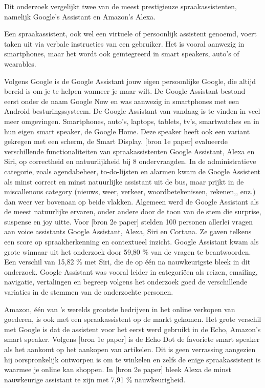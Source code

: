 Dit onderzoek vergelijkt twee van de meest prestigieuze spraakassistenten, namelijk Google’s Assistant en Amazon’s Alexa.

Een spraakassistent, ook wel een virtuele of persoonlijk assistent genoemd, voert taken uit via verbale instructies van een gebruiker. Het is vooral aanwezig in smartphones, maar het wordt ook geïntegreerd in smart speakers, auto's of wearables.

Volgens Google is de Google Assistant jouw eigen persoonlijke Google, die altijd bereid is om je te helpen wanneer je maar wilt. De Google Assistant bestond eerst onder de naam Google Now en was aanwezig in smartphones met een Android besturingssysteem. De Google Assistant van vandaag is te vinden in veel meer omgevingen. Smartphones, auto's, laptops, tablets, tv's, smartwatches en in hun eigen smart speaker, de Google Home. Deze speaker heeft ook een variant gekregen met een scherm, de Smart Display.
[bron 1e paper] evalueerde verschillende functionaliteiten van spraakassistenten Google Assistant, Alexa en Siri, op correctheid en natuurlijkheid bij 8 ondervraagden. In de administratieve categorie, zoals agendabeheer, to-do-lijsten en alarmen kwam de Google Assistent als minst correct en minst natuurlijke assistant uit de bus, maar prijkt in de miscallenous category (nieuws, weer, verkeer, woordbetekenissen, rekenen,, enz.) dan weer ver bovenaan op beide vlakken. Algemeen werd de Google Assistant als de meest natuurlijke ervaren, onder andere door de toon van de stem die surprise, suspense en joy uitte.
Voor [bron 2e paper] stelden 100 personen allerlei vragen aan voice assistants Google Assistant, Alexa, Siri en Cortana. Ze gaven telkens een score op spraakherkenning en contextueel inzicht. Google Assistant kwam als grote winnaar uit het onderzoek door 59,80 \% van de vragen te beantwoorden. Een verschil van 15,82 \% met Siri, die de op één na nauwkeurigste bleek in dit onderzoek. Google Assistant was vooral leider in categoriëen als reizen, emailing, navigatie, vertalingen en begreep volgens het onderzoek goed de verschillende variaties in de stemmen van de onderzochte personen.

Amazon, één van 's werelds grootste bedrijven in het online verkopen van goederen, is ook met een spraakassistent op de markt gekomen. Het grote verschil met Google is dat de assistent voor het eerst werd gebruikt in de Echo, Amazon's smart speaker. Volgens [bron 1e paper] is de Echo Dot de favoriete smart speaker als het aankomt op het aankopen van artikelen. Dit is geen verrassing aangezien hij oorspronkelijk ontworpen is om te winkelen en zelfs de enige spraakassistent is waarmee je online kan shoppen. In [bron 2e paper] bleek Alexa de minst nauwkeurige assistant te zijn met 7,91 \% nauwkeurigheid.

